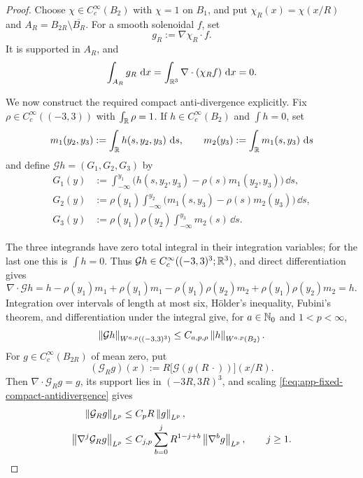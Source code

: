 \begin{proof}
Choose \(\chi\in C_c^\infty(B_2)\) with
\(\chi=1\) on \(B_1\), and put
\(\chi_R(x)=\chi(x/R)\) and
\(A_R=B_{2R}\setminus\overline{B_R}\).  For a smooth solenoidal \(f\), set
\[
 g_R:=\nabla\chi_R\cdot f.
\]
It is supported in \(A_R\), and
\[
 \int_{A_R}g_R\,\,\mathrm d x
 =\int_{\mathbb R^3}\nabla\cdot(\chi_Rf)\,\,\mathrm d x=0.
\]
\begin{samepage}
We now construct the required compact anti-divergence explicitly.  Fix
\(\rho\in C_c^\infty((-3,3))\) with \(\int_{\mathbb R}\rho=1\).  If
\(h\in C_c^\infty(B_2)\) and \(\int h=0\), set
\[
 m_1(y_2,y_3):=\int_{\mathbb R} h(s,y_2,y_3)\,\,\mathrm d s,
 \qquad
 m_2(y_3):=\int_{\mathbb R} m_1(s,y_3)\,\,\mathrm d s
\]
and define \(\mathcal Gh=(G_1,G_2,G_3)\) by
\begin{align*}
 G_1(y)
 &:=\int_{-\infty}^{y_1}
 \bigl(h(s,y_2,y_3)-\rho(s)m_1(y_2,y_3)\bigr)\,\dd s,\\
 G_2(y)
 &:=\rho(y_1)\int_{-\infty}^{y_2}
 \bigl(m_1(s,y_3)-\rho(s)m_2(y_3)\bigr)\,\dd s,\\
 G_3(y)
 &:=\rho(y_1)\rho(y_2)
 \int_{-\infty}^{y_3}m_2(s)\,\dd s.
\end{align*}
\par
\end{samepage}
The three integrands have zero total integral in their integration
variables; for the last one this is \(\int h=0\).  Thus
\(\mathcal Gh\in C_c^\infty((-3,3)^3;\mathbb R^3)\), and direct differentiation
gives
\[
 \nabla\cdot\mathcal Gh
 =h-\rho(y_1)m_1
  +\rho(y_1)m_1-\rho(y_1)\rho(y_2)m_2
  +\rho(y_1)\rho(y_2)m_2
 =h.
\]
Integration over intervals of length at most six, H\"older's inequality,
Fubini's theorem, and differentiation under the integral give, for
\(a\in\mathbb N_0\) and \(1<p<\infty\),
\begin{equation}
 \left\lVert \mathcal Gh\right\rVert_{W^{a,p}((-3,3)^3)}
 \le C_{a,p,\rho}\left\lVert h\right\rVert_{W^{a,p}(B_2)}.
 \label{f:eq:app-fixed-compact-antidivergence}
\end{equation}
For \(g\in C_c^\infty(B_{2R})\) of mean zero, put
\[
 (\mathcal G_Rg)(x)
 :=R\bigl[\mathcal G(g(R\,\cdot))\bigr](x/R).
\]
Then \(\nabla\cdot\mathcal G_Rg=g\), its support lies in
\((-3R,3R)^3\), and scaling \eqref{f:eq:app-fixed-compact-antidivergence}
gives
\begin{align}
 \left\lVert \mathcal G_Rg\right\rVert_{L^p}
 &\le C_pR\left\lVert g\right\rVert_{L^p},\notag\\
 \left\lVert \nabla^j\mathcal G_Rg\right\rVert_{L^p}
 &\le C_{j,p}\sum_{b=0}^{j}
 R^{1-j+b}\left\lVert \nabla^bg\right\rVert_{L^p},
 \qquad j\ge1.
 \label{f:eq:app-scaled-compact-antidivergence}
\end{align}

\end{proof}
